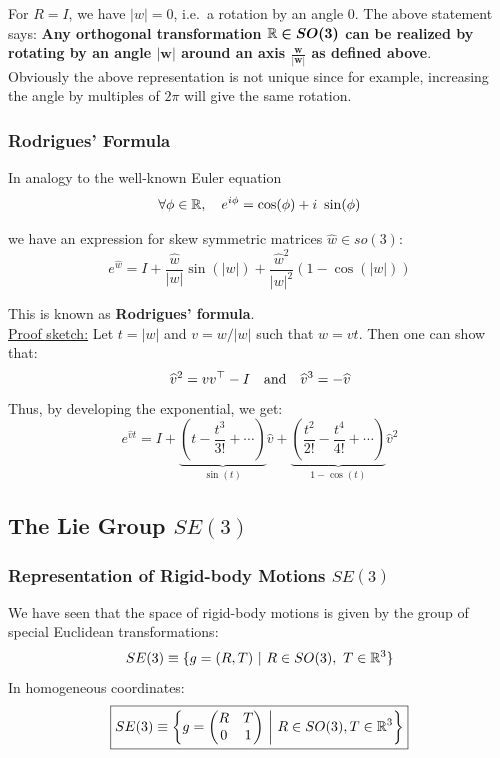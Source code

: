 For $R = I$, we have $|w| = 0$, i.e.\ a rotation by an angle 0.
The above statement says:
\textbf{Any orthogonal transformation $\bm{\mathbb{R} \in SO(3)}$ can be realized
by rotating by an angle $\bm{|w|}$ around an axis
$\bm{\frac{w}{|w|}}$ as defined above}.\\

Obviously the above representation is not unique since for example,
increasing the angle by multiples of $2\pi$ will give the same rotation.


\subsubsection{Rodrigues' Formula}%
\label{ssub:rodrigues_formula}

In analogy to the well-known Euler equation
	\[\forall \phi \in \mathbb{R}, \quad  e^{i\phi} = \cos(\phi) + i\ \sin(\phi)\]

we have an expression for skew symmetric matrices $\widehat{w} \in so(3)$:
	\[\boxed{
	e^{\widehat{w}} = I + \frac{\widehat{w}}{|w|} \sin(|w|)
		+ \frac{\widehat{w}^2}{|w|^2} (1 - \cos(|w|))}\]

This is known as \textbf{Rodrigues' formula}.\\

\underline{Proof sketch:}
Let $t = |w|$ and $v = w/|w|$ such that $w = vt$. Then one can show that:
	\[\widehat{v}^2 = vv^{\top} - I \quad
	\text{and}\quad \widehat{v}^3 = -\widehat{v}\]
Thus, by developing the exponential, we get:
	\[e^{\widehat{v}t} = I +
		\underbrace{\left( t - \frac{t^3}{3!} + \cdots \right)}_{\sin(t)}\widehat{v}
	+ \underbrace{\left(\frac{t^2}{2!}-\frac{t^4}{4!}+\cdots \right)}_{1-\cos(t)}
		\widehat{v}^2\]


\subsection{The Lie Group $SE(3)$}%
\label{sub:the_lie_group_se_3_}


\subsubsection{Representation of Rigid-body Motions $SE(3)$}%
\label{ssub:representation_of_rigid_body_motions_se_3_}

We have seen that the space of rigid-body motions is given by
the group of special Euclidean transformations:
	\[SE(3) \equiv \{ g = (R,T)\ |\ R \in SO(3),\ T \in \mathbb{R}^3\}\]
In homogeneous coordinates:
	\[\boxed{SE(3) \equiv
	\left\{ g = \begin{pmatrix}
		R & T \\
		0 & 1 \\
	\end{pmatrix}\ \middle|\ R \in SO(3), T \in \mathbb{R}^3\right\}}\]

